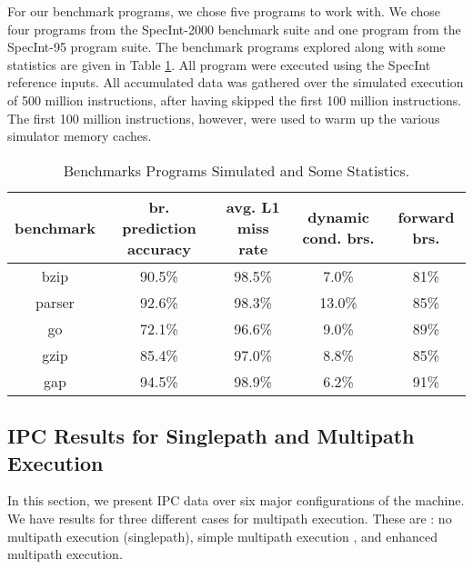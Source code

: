 \documentclass[10pt,dvips]{article}
\begin{document}
For our benchmark programs, we chose five programs to work with.
We chose four programs from the SpecInt-2000 benchmark suite
and one program from the SpecInt-95 program suite.
The benchmark programs explored along with some statistics 
are given in Table \ref{tab:benches}.
All program were executed using the SpecInt reference inputs.
All accumulated data was gathered over the simulated execution of
500 million instructions,
after having skipped the first 100 million instructions.
The first 100 million instructions, however, were used to warm up the
various simulator memory caches.
%
\begin{table}
\begin{center}
\caption{Benchmarks Programs Simulated and Some Statistics.}
\label{tab:benches}
\begin{tabular}{|c|c|c|c|c|}
\hline 
benchmark&
br. prediction accuracy&
avg. L1 miss rate&
dynamic cond. brs.&
forward brs.\\
\hline
\hline 
bzip&90.5\%&98.5\%&7.0\%&81\%\\
\hline 
parser&92.6\%&98.3\%&13.0\%&85\%\\
\hline 
go&72.1\%&96.6\%&9.0\%&89\%\\
\hline 
gzip&85.4\%&97.0\%&8.8\%&85\%\\
\hline 
gap&94.5\%&98.9\%&6.2\%&91\%\\
\hline
\end{tabular}
\end{center}
\end{table}
%
\subsection{IPC Results for Singlepath and Multipath Execution}
%
In this section, we present IPC data over six major configurations
of the machine.  We have results for three different cases
for multipath execution.  These are : no multipath execution (singlepath),
simple multipath execution , and enhanced multipath execution.
\end{document}
